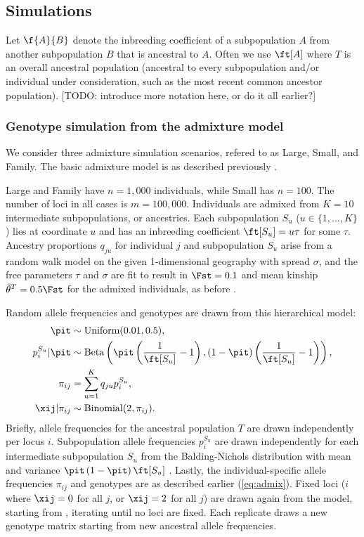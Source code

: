 \documentclass[11pt]{article}
\begin{document}
\subsection{Simulations}

Let $\f{A}{B}$ denote the inbreeding coefficient of a subpopulation $A$ from another subpopulation $B$ that is ancestral to $A$.
Often we use $\ft[A]$ where $T$ is an overall ancestral population (ancestral to every subpopulation and/or individual under consideration, such as the most recent common ancestor population).
[TODO: introduce more notation here, or do it all earlier?]

\subsubsection{Genotype simulation from the admixture model}

We consider three admixture simulation scenarios, refered to as Large, Small, and Family.
The basic admixture model is as described previously \citep{ochoa_fst1, ochoa_estimating_2021}.

Large and Family have $n = 1,000$ individuals, while Small has $n = 100$.
The number of loci in all cases is $m = 100,000$.
Individuals are admixed from $K = 10$ intermediate subpopulations, or ancestries.
Each subpopulation $S_u$ ($u \in \{ 1, ..., K \}$) lies at coordinate $u$ and has an inbreeding coefficient $\ft[S_u] = u \tau$ for some $\tau$.
Ancestry proportions $q_{ju}$ for individual $j$ and subpopulation $S_u$ arise from a random walk model on the given 1-dimensional geography with spread $\sigma$, and the free parameters $\tau$ and $\sigma$ are fit to result in $\Fst = 0.1$ and mean kinship $\bar{\theta}^T = 0.5 \Fst$ for the admixed individuals, as before \citep{ochoa_estimating_2021}.

Random allele frequencies and genotypes are drawn from this hierarchical model:
\begin{align*}
  \pit
  &\sim
    \text{Uniform}( 0.01, 0.5 )
    , \\
  p_i^{S_u} | \pit
  &\sim
    \text{Beta} \left(
    \pit \left( \frac{1}{ \ft[S_u] } - 1 \right),
    \left( 1 - \pit \right) \left( \frac{1}{ \ft[S_u] } - 1 \right)
    \right)
    , \\
  \pi_{ij}
  &=
    \sum_{u = 1}^K q_{ju} p_i^{S_u}
    , \\
  \xij | \pi_{ij}
  &\sim
    \text{Binomial}(2, \pi_{ij})
    .
\end{align*}
Briefly, allele frequencies \pit for the ancestral population $T$ are drawn independently per locus $i$.
Subpopulation allele frequencies $p_i^{S_u}$ are drawn independently for each intermediate subpopulation $S_u$ from the Balding-Nichols distribution with mean \pit and variance $\pit \left( 1 - \pit \right) \ft[S_u]$ \citep{balding_method_1995}.
Lastly, the individual-specific allele frequencies $\pi_{ij}$ and genotypes \xij are as described earlier (\cref{eq:admix}).
Fixed loci ($i$ where $\xij = 0$ for all $j$, or $\xij = 2$ for all $j$) are drawn again from the model, starting from \pit, iterating until no loci are fixed.
Each replicate draws a new genotype matrix starting from new ancestral allele frequencies.
\end{document}
